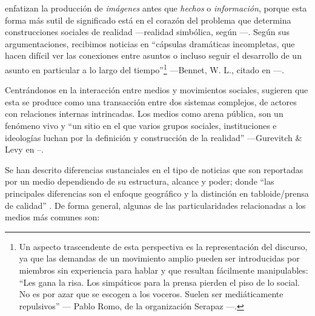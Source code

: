 \documentclass[letterpaper, 11pt]{book}
\theoremstyle{definition}
\theoremstyle{remark}
\begin{document}
\citet{1992_Gamson_mediosRealidad} enfatizan la producción de \emph{imágenes} antes que \emph{hechos} o \emph{información}, porque esta forma más sutil de significado está en el corazón del problema que determina construcciones sociales de realidad ---realidad simbólica, según \citet{2008_ASF_Medios}---. 
Según sus argumentaciones, recibimos noticias en  ``cápsulas dramáticas incompletas, que hacen difícil ver las conexiones entre asuntos o incluso seguir el desarrollo de un asunto en particular a lo largo del tiempo''\footnote{
Un aspecto trascendente de esta perspectiva es la representación del discurso, ya que las demandas de un movimiento amplio pueden ser introducidas por miembros sin experiencia para hablar y que resultan fácilmente manipulables: ``Les gana la risa. Los simpáticos para la prensa pierden el piso de lo social. No es por azar que se escogen a los voceros. Suelen ser mediáticamente repulsivos'' --- Pablo Romo, de la organización Serapaz \citep[52]{2013_Rovira_ActivismoMediatico}---.} ---Bennet, W. L., citado en \citep[387]{1992_Gamson_mediosRealidad}---.

Centrándonos en la interacción entre medios y movimientos sociales, \citet{1993_Gamson_medios} sugieren que esta se produce como una transacción entre dos sistemas complejos, de actores con relaciones internas intrincadas. 
Los medios como arena pública, son un fenómeno vivo y ``un sitio en el que varios grupos sociales, instituciones e ideologías luchan por la definición y construcción de la realidad'' ---Gurevitch \& Levy en \citep[385]{1992_Gamson_mediosRealidad}--.

Se han descrito diferencias sustanciales en el tipo de noticias que son reportadas por un medio dependiendo de su estructura, alcance y poder; donde ``las principales diferencias son el enfoque geográfico y la distinción en tabloide/prensa de calidad'' \citep[348]{2014_Hutter_AEP}. De forma general, algunas de las particularidades relacionadas a los medios más comunes son:
\end{document}
